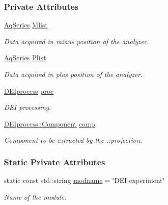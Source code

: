 \subsubsection*{Private Attributes}
\begin{DoxyCompactItemize}
\item 
\hyperlink{classAqSeries}{AqSeries} \hyperlink{classDEIexp_a7bbcf7cedf31bde767e23d713b2f2b91}{Mlist}
\begin{DoxyCompactList}\small\item\em Data acquired in minus position of the analyzer. \item\end{DoxyCompactList}\item 
\hyperlink{classAqSeries}{AqSeries} \hyperlink{classDEIexp_a8a68a17d467ff60766bb46dc86b86950}{Plist}
\begin{DoxyCompactList}\small\item\em Data acquired in plus position of the analyzer. \item\end{DoxyCompactList}\item 
\hyperlink{classDEIprocess}{DEIprocess} \hyperlink{classDEIexp_a735b9b8675b0bec7511edee60caac2af}{proc}
\begin{DoxyCompactList}\small\item\em DEI processing. \item\end{DoxyCompactList}\item 
\hyperlink{classDEIprocess_a3a41867d8f9d10e77541ae8484256cd2}{DEIprocess::Component} \hyperlink{classDEIexp_ad8992574364a39e5e016a439323251a1}{comp}
\begin{DoxyCompactList}\small\item\em Component to be extracted by the ::projection. \item\end{DoxyCompactList}\end{DoxyCompactItemize}
\subsubsection*{Static Private Attributes}
\begin{DoxyCompactItemize}
\item 
static const std::string \hyperlink{group__deiedei_ga8e2f6229a9aeb4e72e58ba3af8efe3d8}{modname} = \char`\"{}DEI experiment\char`\"{}
\begin{DoxyCompactList}\small\item\em Name of the module. \item\end{DoxyCompactList}\end{DoxyCompactItemize}


